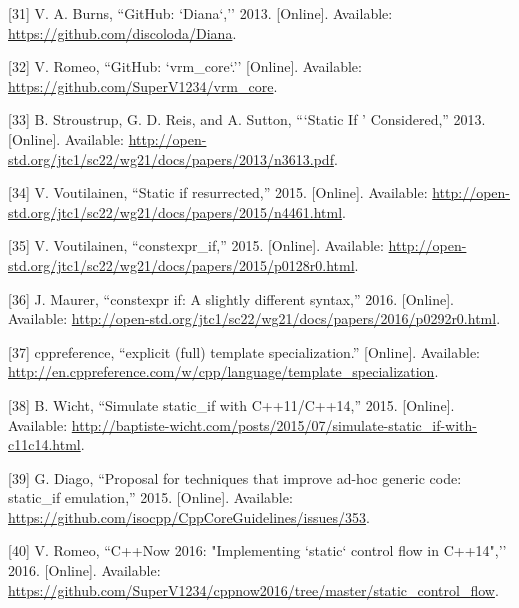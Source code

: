 \documentclass[twoside, 12pt, a4paper, openright]{book}
\begin{document}
\hypertarget{ref-github_diana}{}
{[}31{]} V. A. Burns, ``GitHub: `Diana`,'' 2013. {[}Online{]}.
Available: \url{https://github.com/discoloda/Diana}.

\hypertarget{ref-github_vrmcore}{}
{[}32{]} V. Romeo, ``GitHub: `vrm\_core`.'' {[}Online{]}. Available:
\url{https://github.com/SuperV1234/vrm_core}.

\hypertarget{ref-isocpp_sif0}{}
{[}33{]} B. Stroustrup, G. D. Reis, and A. Sutton, ```Static If '
Considered,'' 2013. {[}Online{]}. Available:
\url{http://open-std.org/jtc1/sc22/wg21/docs/papers/2013/n3613.pdf}.

\hypertarget{ref-isocpp_sif1}{}
{[}34{]} V. Voutilainen, ``Static if resurrected,'' 2015. {[}Online{]}.
Available:
\url{http://open-std.org/jtc1/sc22/wg21/docs/papers/2015/n4461.html}.

\hypertarget{ref-isocpp_sif2}{}
{[}35{]} V. Voutilainen, ``constexpr\_if,'' 2015. {[}Online{]}.
Available:
\url{http://open-std.org/jtc1/sc22/wg21/docs/papers/2015/p0128r0.html}.

\hypertarget{ref-isocpp_sif3}{}
{[}36{]} J. Maurer, ``constexpr if: A slightly different syntax,'' 2016.
{[}Online{]}. Available:
\url{http://open-std.org/jtc1/sc22/wg21/docs/papers/2016/p0292r0.html}.

\hypertarget{ref-cppreference_ets}{}
{[}37{]} cppreference, ``explicit (full) template specialization.''
{[}Online{]}. Available:
\url{http://en.cppreference.com/w/cpp/language/template_specialization}.

\hypertarget{ref-sif0}{}
{[}38{]} B. Wicht, ``Simulate static\_if with C++11/C++14,'' 2015.
{[}Online{]}. Available:
\url{http://baptiste-wicht.com/posts/2015/07/simulate-static_if-with-c11c14.html}.

\hypertarget{ref-sif1}{}
{[}39{]} G. Diago, ``Proposal for techniques that improve ad-hoc generic
code: static\_if emulation,'' 2015. {[}Online{]}. Available:
\url{https://github.com/isocpp/CppCoreGuidelines/issues/353}.

\hypertarget{ref-sif2}{}
{[}40{]} V. Romeo, ``C++Now 2016: "Implementing `static` control flow in
C++14",'' 2016. {[}Online{]}. Available:
\url{https://github.com/SuperV1234/cppnow2016/tree/master/static_control_flow}.
\end{document}
